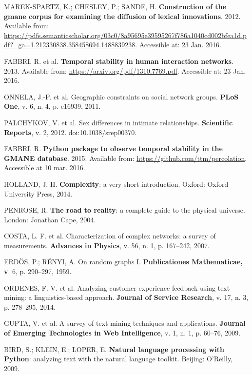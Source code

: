 \documentclass[
12pt,		%
openright,	%
twoside,  %
a4paper,			%
chapter=TITLE,		%
english,			%
french,				%
spanish,			%
brazil				%
]{USPSC}
\begin{document}
\begin{thebibliography}{999}
	MAREK-SPARTZ, K.; CHESLEY, P.; SANDE, H. \textbf{Construction of the gmane corpus for examining the diffusion of lexical innovations}. 2012. Available from: \url{https://pdfs.semanticscholar.org/03c0/8a95695e39595267f786a1040cd002bfea1d.pdf?_ga=1.212330838.358458694.1488839238}. Accessible  at: 23 Jan. 2016.

	FABBRI, R. et al. \textbf{Temporal stability in human interaction networks}. 2013. Available from: \url{https://arxiv.org/pdf/1310.7769.pdf}. Accessible at: 23 Jan. 2016.

	ONNELA, J.-P. et al. Geographic constraints on social network groups. \textbf{PLoS One}, v. 6, n. 4, p. e16939, 2011.

	PALCHYKOV, V. et al. Sex differences in intimate relationships. \textbf{Scientific Reports}, v. 2, 2012. doi:10.1038/srep00370.

	FABBRI, R. \textbf{Python package to observe temporal stability in the GMANE database}. 2015. Available from: \url{https://github.com/ttm/percolation}. Accessible at 10 mar. 2016.

	HOLLAND, J. H. \textbf{Complexity}: a very short introduction. Oxford: Oxford University Press, 2014.

	PENROSE, R. \textbf{The road to reality}: a complete guide to the physical universe. London: Jonathan Cape, 2004.

	COSTA, L. F. et al. Characterization of complex networks: a survey of measurements. \textbf{Advances in Physics}, v. 56, n. 1, p. 167–242, 2007.

	ERDÖS, P.; RÉNYI, A. On random graphs I. \textbf{Publicationes Mathematicae, v}. 6, p. 290–297, 1959.

	ORDENES, F. V. et al. Analyzing customer experience feedback using text mining: a linguistics-based approach. \textbf{Journal of Service Research}, v. 17, n. 3, p. 278–295, 2014.

	GUPTA, V. et al. A survey of text mining techniques and applications. \textbf{Journal of Emerging Technologies in Web Intelligence}, v. 1, n. 1, p. 60–76, 2009.

	BIRD, S.; KLEIN, E.; LOPER, E. \textbf{Natural language processing with Python}: analyzing text with the natural language toolkit. Beijing: O'Reilly, 2009.


\end{thebibliography}
\end{document}
